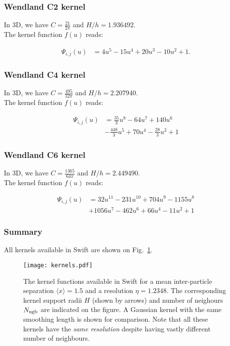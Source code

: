 \documentclass[a4paper]{mnras}
\newcommand{\swift}{{\sc Swift}\xspace}
\begin{document}
\subsubsection{Wendland C2 kernel}

In 3D, we have $C=\frac{21}{2\pi}$ and $H/h = 1.936492$.\\
The kernel function $f(u)$ reads:

\begin{align}
  \Psi_{i,j}(u) &= 4u^5 - 15u^4 + 20u^3 - 10u^2 + 1.
    \nonumber
\end{align}


\subsubsection{Wendland C4 kernel}

In 3D, we have $C=\frac{495}{32\pi}$ and $H/h = 2.207940$.\\
The kernel function $f(u)$ reads:

\begin{align}
  \Psi_{i,j}(u) &= \frac{35}{3}u^8 - 64u^7 + 140u^6\\
  & - \frac{448}{3}u^5 + 70u^4 - \frac{28}{3}u^2 + 1
    \nonumber
\end{align}


\subsubsection{Wendland C6 kernel}

In 3D, we have $C=\frac{1365}{64\pi}$ and $H/h = 2.449490$.\\
The kernel function $f(u)$ reads:

\begin{align}
  \Psi_{i,j}(u) &= 32u^{11} - 231u^{10} + 704u^9 - 1155u^8\\
  & + 1056u^7 - 462u^6 + 66u^4 - 11u^2 + 1
    \nonumber
\end{align}


\subsubsection{Summary}

All kernels available in \swift are shown on Fig.~\ref{fig:sph:kernels}.

\begin{figure}
\texttt{[image: kernels.pdf]}
\caption{The kernel functions available in \swift for a mean
  inter-particle separation $\langle x\rangle=1.5$ and a resolution
  $\eta=1.2348$. The corresponding kernel support radii $H$ (shown by
  arrows) and number of neighours $N_{\rm ngb}$ are indicated on the
  figure. A Gaussian kernel with the same smoothing length is shown
  for comparison. Note that all these kernels have the \emph{same
    resolution} despite having vastly different number of neighbours.}
\label{fig:sph:kernels}
\end{figure}
\end{document}
